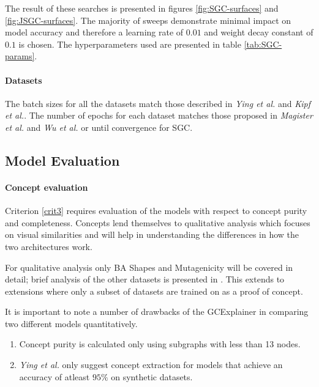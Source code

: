 The result of these searches is presented in figures \ref{fig:SGC-surfaces} and \ref{fig:JSGC-surfaces}.
The majority of sweeps demonstrate minimal impact on model accuracy and therefore a learning rate of $0.01$ and weight decay constant of $0.1$ is chosen.
The hyperparameters used are presented in table \ref{tab:SGC-params}.

%

\paragraph{Datasets}
The batch sizes for all the datasets match those described in \textit{Ying et al.}\cite{ying2019gnnexplainer} and \textit{Kipf et al.}\cite{kipf2016semi}.
The number of epochs for each dataset matches those proposed in \textit{Magister et al.}\cite{magister2021gcexplainer} and \textit{Wu et al.}\cite{wu2019simplifying} or until convergence for SGC.

\subsection{Model Evaluation}
\label{sec:evaluation}

\paragraph{Concept evaluation}
Criterion \ref{crit3} requires evaluation of the models with respect to concept purity and completeness.
Concepts lend themselves to qualitative analysis which focuses on visual similarities and will help in understanding the differences in how the two architectures work.

For qualitative analysis only BA Shapes and Mutagenicity will be covered in detail; brief analysis of the other datasets is presented in .
This extends to extensions where only a subset of datasets are trained on as a proof of concept.

It is important to note a number of drawbacks of the GCExplainer in comparing two different models quantitatively.
\begin{enumerate}
    \item 
        Concept purity is calculated only using subgraphs with less than 13 nodes.
    \item 
        \label{nb:accuracy}
        \textit{Ying et al.}\cite{ying2019gnnexplainer} only suggest concept extraction for models that achieve an accuracy of atleast $95\%$ on synthetic datasets. 
\end{enumerate}

